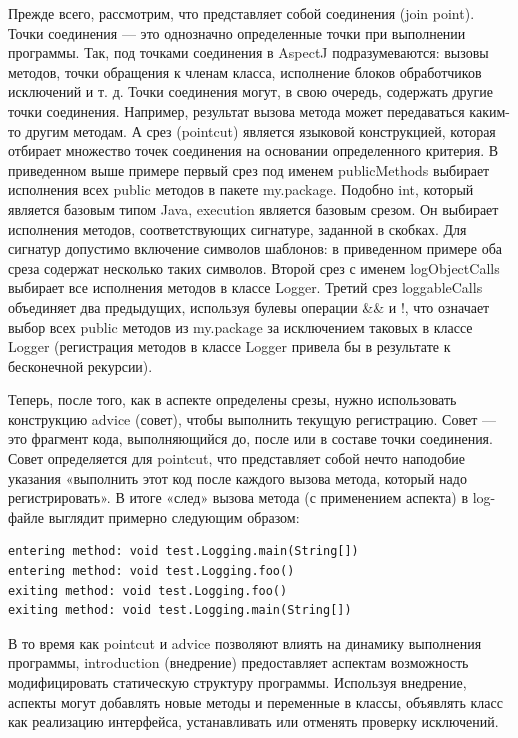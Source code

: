 \documentclass[a4paper,12pt,titlepage]{extarticle}
\begin{document}
Прежде всего, рассмотрим, что представляет собой соединения (join point).
Точки соединения --- это однозначно определенные точки при выполнении программы.
Так, под точками соединения в AspectJ подразумеваются: вызовы методов, точки
обращения к членам класса, исполнение блоков обработчиков исключений и т. д.
Точки соединения могут, в свою очередь, содержать другие точки соединения.
Например, результат вызова метода может передаваться каким-то другим методам. А
срез (pointcut) является языковой конструкцией, которая отбирает множество точек
соединения на основании определенного критерия. В приведенном выше примере
первый срез под именем publicMethods выбирает исполнения всех public
методов в пакете my.package. Подобно int, который является базовым типом
Java, execution является базовым срезом. Он выбирает исполнения методов,
соответствующих сигнатуре, заданной в скобках. Для сигнатур допустимо включение
символов шаблонов: в приведенном примере оба среза содержат несколько
таких символов. Второй срез с именем logObjectCalls выбирает все исполнения
методов в классе Logger. Третий срез loggableCalls объединяет два
предыдущих, используя булевы операции \&\& и !, что означает выбор всех public
методов из my.package за исключением таковых в классе Logger (регистрация
методов в классе Logger привела бы в результате к бесконечной рекурсии).

Теперь, после того, как в аспекте определены срезы, нужно использовать
конструкцию advice (совет), чтобы выполнить текущую регистрацию. Совет — это
фрагмент кода, выполняющийся до, после или в составе точки соединения. Совет
определяется для pointcut, что представляет собой нечто наподобие указания
«выполнить этот код после каждого вызова метода, который надо регистрировать».
В итоге «след» вызова метода (с применением аспекта) в log-файле выглядит
примерно следующим образом:
\begin{verbatim}
entering method: void test.Logging.main(String[])
entering method: void test.Logging.foo()
exiting method: void test.Logging.foo()
exiting method: void test.Logging.main(String[]) 
\end{verbatim}

В то время как pointcut и advice позволяют влиять на динамику выполнения
программы, introduction (внедрение) предоставляет аспектам возможность модифицировать
статическую структуру программы. Используя внедрение, аспекты могут
добавлять новые методы и переменные в классы, объявлять класс как реализацию интерфейса,
устанавливать или отменять проверку исключений.
\end{document}
